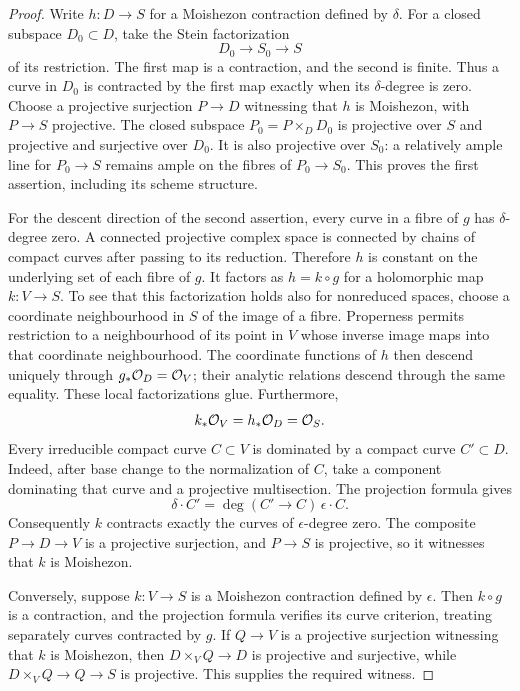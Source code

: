 \begin{proof}
Write $h:D\to S$ for a Moishezon contraction defined by
$\delta$. For a closed subspace $D_0\subset D$, take the Stein
factorization
\[
                 D_0\longrightarrow S_0\longrightarrow S
\]
of its restriction. The first map is a contraction, and the second
is finite. Thus a curve in $D_0$ is contracted by the first map
exactly when its $\delta$-degree is zero. Choose a projective
surjection $P\to D$ witnessing that $h$ is Moishezon, with
$P\to S$ projective. The closed subspace
$P_0=P\times_D D_0$ is projective over $S$ and projective
and surjective over $D_0$. It is also projective over $S_0$:
a relatively ample line for $P_0\to S$ remains ample on the
fibres of $P_0\to S_0$. This proves the first assertion,
including its scheme structure.

For the descent direction of the second assertion, every curve
in a fibre of $g$ has $\delta$-degree zero. A connected
projective complex space is connected by chains of compact curves
after passing to its reduction. Therefore $h$ is constant on
the underlying set of each fibre of $g$. It factors as
$h=k\circ g$ for a holomorphic map $k:V\to S$.
To see that this factorization holds also for nonreduced spaces,
choose a coordinate neighbourhood in $S$ of the image of a fibre.
Properness permits restriction to a neighbourhood of its point
in $V$ whose inverse image maps into that coordinate
neighbourhood. The coordinate functions of $h$ then descend
uniquely through $g_*\mathcal O_D=\mathcal O_V$; their analytic relations
descend through the same equality. These local factorizations
glue. Furthermore,
\[
                 k_*\mathcal O_V=h_*\mathcal O_D=\mathcal O_S.
\]
Every irreducible compact curve $C\subset V$ is dominated by
a compact curve $C'\subset D$. Indeed, after base change to
the normalization of $C$, take a component dominating that curve
and a projective multisection. The projection formula gives
\[
       \delta\cdot C'
          =\deg(C'\to C)\,\epsilon\cdot C.
\]
Consequently $k$ contracts exactly the curves of
$\epsilon$-degree zero. The composite $P\to D\to V$
is a projective surjection, and $P\to S$ is projective, so
it witnesses that $k$ is Moishezon.

Conversely, suppose $k:V\to S$ is a Moishezon contraction
defined by $\epsilon$. Then $k\circ g$ is a contraction,
and the projection formula verifies its curve criterion, treating
separately curves contracted by $g$. If $Q\to V$ is a
projective surjection witnessing that $k$ is Moishezon, then
$D\times_V Q\to D$ is projective and surjective, while
$D\times_V Q\to Q\to S$ is projective. This supplies the
required witness.
\end{proof}

